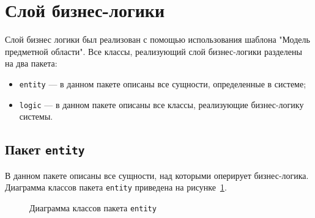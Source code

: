 \section{Слой бизнес-логики}
	Слой бизнес логики был реализован с помощью использования шаблона "Модель предметной области". Все классы, реализующий слой бизнес-логики разделены на два пакета:
	\begin{itemize}
		\item \texttt{entity} --- в данном пакете описаны все сущности, определенные в системе;
		\item \texttt{logic} --- в данном пакете описаны все классы, реализующие бизнес-логику системы.
	\end{itemize}
	
	\subsection{Пакет \texttt{entity}}
	В данном пакете описаны все сущности, над которыми оперирует бизнес-логика. Диаграмма классов пакета \texttt{entity} приведена на рисунке~\ref{fig:entityDiagram}.
	\begin{figure}[h]
		\caption{Диаграмма классов пакета \texttt{entity}}
		\label{fig:entityDiagram}
	\end{figure}
	
